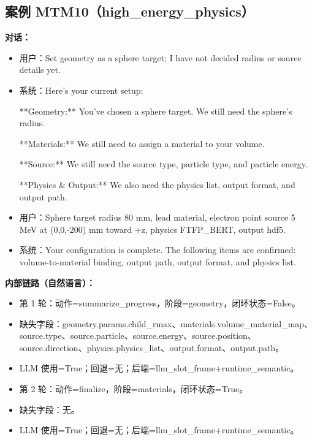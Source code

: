 \documentclass[11pt]{ctexart}
\begin{document}
\subsection{案例 MTM10（high\_energy\_physics）}
\textbf{对话：}
\begin{itemize}
\item 用户：Set geometry as a sphere target; I have not decided radius or source details yet.
\item 系统：Here's your current setup:

**Geometry:** You've chosen a sphere target. We still need the sphere's radius.

**Materials:** We still need to assign a material to your volume.

**Source:** We still need the source type, particle type, and particle energy.

**Physics \& Output:** We also need the physics list, output format, and output path.
\item 用户：Sphere target radius 80 mm, lead material, electron point source 5 MeV at (0,0,-200) mm toward +z, physics FTFP\_BERT, output hdf5.
\item 系统：Your configuration is complete. The following items are confirmed: volume-to-material binding, output path, output format, and physics list.
\end{itemize}
\textbf{内部链路（自然语言）：}
\begin{itemize}
\item 第 1 轮：动作=summarize\_progress，阶段=geometry，闭环状态=False。
\item 缺失字段：geometry.params.child\_rmax、materials.volume\_material\_map、source.type、source.particle、source.energy、source.position、source.direction、physics.physics\_list、output.format、output.path。
\item LLM 使用=True；回退=无；后端=llm\_slot\_frame+runtime\_semantic。
\item 第 2 轮：动作=finalize，阶段=materials，闭环状态=True。
\item 缺失字段：无。
\item LLM 使用=True；回退=无；后端=llm\_slot\_frame+runtime\_semantic。
\end{itemize}
\end{document}
